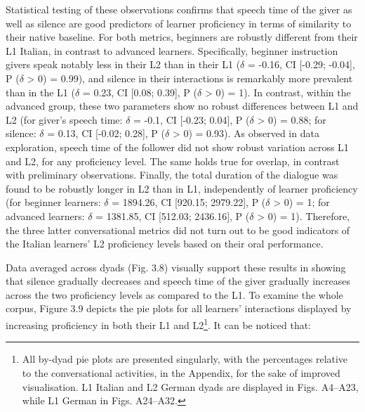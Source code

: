 \begin{styleStandard}
Statistical testing of these observations confirms that speech time of the giver as well as silence are good predictors of learner proficiency in terms of similarity to their native baseline. For both metrics, beginners are robustly different from their L1 Italian, in contrast to advanced learners. Specifically, beginner instruction givers speak notably less in their L2 than in their L1 ($\delta $ = -0.16, CI [-0.29; -0.04], P ($\delta $ {\textgreater} 0) = 0.99), and silence in their interactions is remarkably more prevalent than in the L1 ($\delta $ = 0.23, CI [0.08; 0.39], P ($\delta $ {\textgreater} 0) = 1). In contrast, within the advanced group, these two parameters show no robust differences between L1 and L2 (for giver’s speech time: $\delta $ = -0.1, CI [-0.23; 0.04], P ($\delta $ {\textgreater} 0) = 0.88; for silence: $\delta $ = 0.13, CI [-0.02; 0.28], P ($\delta $ {\textgreater} 0) = 0.93). As observed in data exploration, speech time of the follower did not show robust variation across L1 and L2, for any proficiency level. The same holds true for overlap, in contrast with preliminary observations. Finally, the total duration of the dialogue was found to be robustly longer in L2 than in L1, independently of learner proficiency (for beginner learners: $\delta $ = 1894.26, CI [920.15; 2979.22], P ($\delta $ {\textgreater} 0) = 1; for advanced learners: $\delta $ = 1381.85, CI [512.03; 2436.16], P ($\delta $ {\textgreater} 0) = 1). Therefore, the three latter conversational metrics did not turn out to be good indicators of the Italian learners’ L2 proficiency levels based on their oral performance.
\end{styleStandard}

\begin{styleStandard}
Data averaged across dyads (Fig. 3.8) visually support these results in showing that silence gradually decreases and speech time of the giver gradually increases across the two proficiency levels as compared to the L1. To examine the whole corpus, Figure 3.9 depicts the pie plots for all learners’ interactions displayed by increasing proficiency in both their L1 and L2\footnote{All by-dyad pie plots are presented singularly, with the percentages relative to the conversational activities, in the Appendix, for the sake of improved visualisation. L1 Italian and L2 German dyads are displayed in Figs. A4–A23, while L1 German in Figs. A24–A32.\par }. It can be noticed that:
\end{styleStandard}


